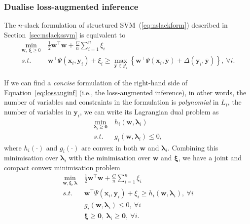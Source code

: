 \documentclass[9pt]{extarticle}
\begin{document}
\subsubsection{Dualise loss-augmented inference}
\label{sec:dualinf}

The $n$-slack formulation of structured SVM~(\ref{eq:nslackform}) described in Section~\ref{sec:nslackssvm} is equivalent to
\begin{align}
\min_{\mathbf{w}, ~\bm{\xi} \ge 0} ~& \frac{1}{2} \mathbf{w}^\top \mathbf{w} + \frac{C}{n} \sum_{i=1}^n \xi_i \\
s.t.~~ ~& \mathbf{w}^\top \Psi(\mathbf{x}_i, \mathbf{y}_i) + \xi_i \ge
          \max_{\bar{\mathbf{y}} \in \mathcal{Y}_i} 
          \left\{\mathbf{w}^\top \Psi(\mathbf{x}_i, \bar{\mathbf{y}}) + \Delta(\mathbf{y}_i, \bar{\mathbf{y}}) \right\},~\forall i. \label{eq:lossauginf}
\end{align}

If we can find a \emph{concise} formulation of the right-hand side of Equation~\ref{eq:lossauginf} (i.e., the loss-augmented inference),
in other words, the number of variables and constraints in the formulation is \emph{polynomial} in $L_i$, the number of variables in $\mathbf{y}_i$,
we can write its Lagrangian dual problem as 
\begin{align*}
\min_{\bm{\lambda}_i \ge \mathbf{0}} ~& h_i(\mathbf{w}, \bm{\lambda}_i) \\
s.t.~~ ~& g_i(\mathbf{w}, \bm{\lambda}_i) \le 0,
\end{align*}
where $h_i(\cdot)$ and $g_i(\cdot)$ are convex in both $\mathbf{w}$ and $\bm{\lambda}_i$.
Combining this minimisation over $\bm{\lambda}_i$ with the minimisation over $\mathbf{w}$ and $\bm{\xi}$,
we have a joint and compact convex minimisation problem
\begin{equation}
\label{eq:dualinf}
\begin{aligned}
\min_{\mathbf{w}, \bm{\xi}, \bm{\lambda}} ~& \frac{1}{2} \mathbf{w}^\top \mathbf{w} + \frac{C}{n} \sum_{i=1}^n \xi_i \\
s.t.~~ ~& \mathbf{w}^\top \Psi(\mathbf{x}_i, \mathbf{y}_i) + \xi_i \ge h_i(\mathbf{w}, \bm{\lambda}_i), ~\forall i \\
        & g_i(\mathbf{w}, \bm{\lambda}_i) \le 0, ~\forall i \\
        & \bm{\xi} \ge \mathbf{0}, ~\bm{\lambda}_i \ge \mathbf{0}, ~\forall i.
\end{aligned}
\end{equation}
\end{document}
